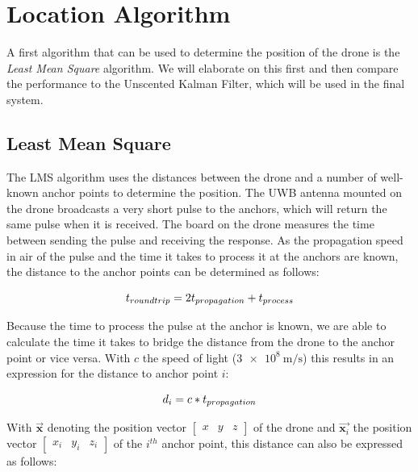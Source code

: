 \documentclass[a4paper]{article}        %
\begin{document}
		



\section{Location Algorithm}
	A first algorithm that can be used to determine the position of the drone is the \textit{Least Mean Square} algorithm. We will elaborate on this first and then compare the performance to the Unscented Kalman Filter, which will be used in the final system. 

	\subsection{Least Mean Square}
	\label{subsec:LMS}

		The LMS algorithm uses the distances between the drone and a number of well-known anchor points to determine the position. The UWB antenna mounted on the drone broadcasts a very short pulse to the anchors, which will return the same pulse when it is received. The board on the drone measures the time between sending the pulse and receiving the response. As the propagation speed in air of the pulse and the time it takes to process it at the anchors are known, the distance to the anchor points can be determined as follows:

		\begin{equation}
		\centering
			t_{roundtrip} = 2t_{propagation} + t_{process}
		\end{equation} 

		Because the time to process the pulse at the anchor is known, we are able to calculate the time it takes to bridge the distance from the drone to the anchor point or vice versa. With $c$ the speed of light ($\SI{3e8}{\meter\per\second}$) this results in an expression for the distance to anchor point $i$:

		\begin{equation}
		\centering
			d_i = c*t_{propagation}
		\end{equation}

		With $\vec{\textbf{x}}$ denoting the position vector $\begin{bmatrix} x & y & z \end{bmatrix}$ of the drone and $\vec{\textbf{x}_i}$ the position vector $\begin{bmatrix} x_i & y_i & z_i \end{bmatrix}$ of the $i^{th}$ anchor point, this distance can also be expressed as follows:
\end{document}
